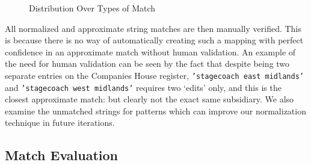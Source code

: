 \documentclass[11pt]{article}
\begin{document}
\begin{figure}[!t]
\caption{Distribution Over Types of Match}\label{distributionofmatches}
\end{figure}

All normalized and approximate string matches are then manually verified. This is because there is no way of automatically creating such a mapping with perfect confidence in an approximate match without human validation. An example of the need for human validation can be seen by the fact that despite being two separate entries on the Companies House register, \texttt{'stagecoach east midlands'} and \texttt{'stagecoach west midlands'} requires two `edits' only, and this is the closest approximate match: but clearly not the exact same subsidiary. We also examine the unmatched strings for patterns which can improve our normalization technique in future iterations.

\subsection{Match Evaluation}
\end{document}
